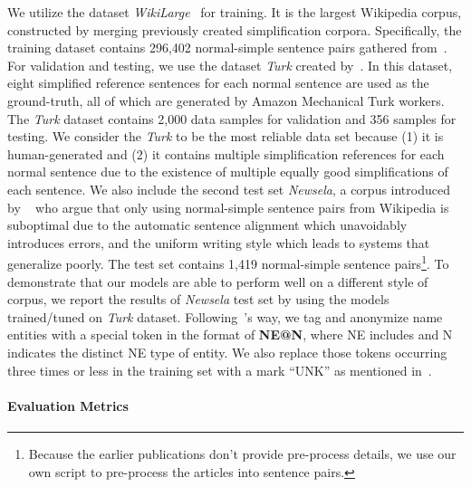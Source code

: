 \documentclass[11pt,a4paper]{article}
\begin{document}
We utilize the dataset \textit{WikiLarge}~\cite{zhang2017sentence} for training. It is the largest Wikipedia corpus, constructed by merging previously created simplification corpora. Specifically, the training dataset contains 296,402 normal-simple sentence pairs gathered from~\cite{zhu2010monolingual, woodsend2011learning, kauchak2013improving}.
For validation and testing, we use the dataset \textit{Turk} created by~\cite{xu2016optimizing}. In this dataset, eight simplified reference sentences for each normal sentence are used as the ground-truth, all of which are generated by Amazon Mechanical Turk workers. The \textit{Turk} dataset contains 2,000 data samples for validation and 356 samples for testing. We consider the \textit{Turk} to be the most reliable data set because (1) it is human-generated and (2) it contains multiple simplification references for each normal sentence due to the existence of multiple equally good simplifications of each sentence.
We also include the second test set \textit{Newsela}, a corpus introduced by ~\cite{xu2015problems} who argue that only using normal-simple sentence pairs from Wikipedia is suboptimal due to the automatic sentence alignment which unavoidably introduces errors, and the uniform writing style which leads to systems that generalize poorly. 
The test set contains 1,419 normal-simple sentence pairs\footnote{Because the earlier publications don't provide pre-process details, we use our own script to pre-process the articles into sentence pairs.}. To demonstrate that our models are able to perform well on a different style of corpus, we report the results of \textit{Newsela} test set by using the models trained/tuned on \textit{Turk} dataset.
Following~\citet{zhang2017sentence}'s way, we tag and anonymize name entities with a special token in the format of \textbf{NE@N}, where NE includes  and N indicates the  distinct NE type of entity. We also replace those tokens occurring three times or less in the training set with a mark ``UNK'' as mentioned in~\cite{zhang2017sentence}.

\paragraph{Evaluation Metrics}
\end{document}

